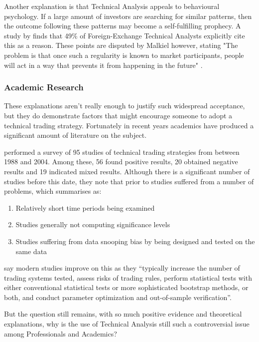\documentclass{article}
\theoremstyle{definition}
\begin{document}
Another explanation is that Technical Analysis appeals to behavioural psychology. If a large amount of investors are searching for similar patterns, then the outcome following these patterns may become a self-fulfilling prophecy. A study by \cite{examininguse1997} finds that 49\% of Foreign-Exchange Technical Analysts explicitly cite this as a reason. These points are disputed by Malkiel however, stating "The problem is that once such a regularity is known to market participants, people will act in a way that prevents it from happening in the future" \cite[p.162]{randomwalk2012}.

\subsubsection{Academic Research}

These explanations aren't really enough to justify such widespread acceptance, but they do demonstrate factors that might encourage someone to adopt a technical trading strategy. Fortunately in recent years academics have produced a significant amount of literature on the subject.

\cite{taprofitability} performed a survey of 95 studies of technical trading strategies from between 1988 and 2004. Among these, 56 found positive results, 20 obtained negative results and 19 indicated mixed results. Although there is a significant number of studies before this date, they note that prior to \cite{lukac1988} studies suffered from a number of problems, which \cite{brock1992} summarises as:
\begin{enumerate}
\item Relatively short time periods being examined 
\item Studies generally not computing significance levels 
\item Studies suffering from data snooping bias by being designed and tested on the same data
\end{enumerate}

\cite{taprofitability} say modern studies improve on this as they ``typically
increase the number of trading systems tested, assess risks of trading rules,
perform statistical tests with either conventional statistical tests or more sophisticated bootstrap methods, or both, and conduct parameter optimization and out-of-sample verification''.

But the question still remains, with so much positive evidence and theoretical explanations, why is the use of Technical Analysis still such a controversial issue among Professionals and Academics? 
\end{document}
